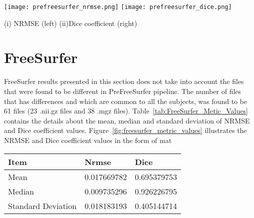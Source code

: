 \begin{center}
\texttt{[image: prefreesurfer\_nrmse.png]}%
\texttt{[image: prefreesurfer\_dice.png]}
\caption*{(i) NRMSE (left) (ii)Dice coefficient (right)}
\label{fig:prefreesurfer_metric_values}
\end{center}

\section{FreeSurfer} \label{sec:Freesurfer}
FreeSurfer results presented in this section does not take into account the files that were found to be different in PreFreeSurfer pipeline. The number of files that has differences and which are common to all the subjects, was found to be 61 files (23 .nii.gz files and 38 .mgz files). Table~\ref{tab:FreeSurfer_Metic_Values} contains the details about the mean, median and standard deviation of NRMSE and Dice coefficient values. Figure~\ref{fig:freesurfer_metric_values} illustrates the NRMSE and Dice coefficient values in the form of mat
\hfill \break
\begin{center}
\begin{tabular}{|l|l|l|}
\hline
\textbf{Item}      & \textbf{Nrmse} & \textbf{Dice} \\ \hline
Mean               & 0.017669782    & 0.695379753   \\ \hline
Median             & 0.009735296    & 0.926226795   \\ \hline
Standard Deviation & 0.018183193    & 0.405144714   \\ \hline
\end{tabular}
\label{tab:FreeSurfer_Metic_Values}
\end{center}
\hfill \break

